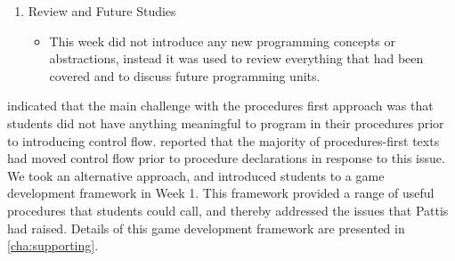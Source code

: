 \begin{enumerate}
  \item Review and Future Studies
  \begin{itemize}[noitemsep,nolistsep]
  	\item This week did not introduce any new programming concepts or abstractions, instead it was used to review everything that had been covered and to discuss future programming units.
  \end{itemize}
\end{enumerate}

\citet{Pattis:1990,Pattis:1993} indicated that the main challenge with the procedures first approach was that students did not have anything meaningful to program in their procedures prior to introducing control flow. \citet{Pattis:1993} reported that the majority of procedures-first texts had moved control flow prior to procedure declarations in response to this issue. We took an alternative approach, and introduced students to a game development framework in Week 1. This framework provided a range of useful procedures that students could call, and thereby addressed the issues that Pattis had raised. Details of this game development framework are presented in \cref{cha:supporting}.

